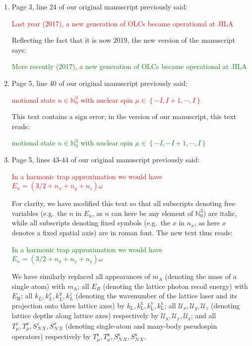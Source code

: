 \documentclass[preprint,showkeys,nofootinbib]{revtex4-1}
\renewcommand{\t}{\text} %
\newcommand{\p}[1]{\left(#1\right)} %
\renewcommand{\set}[1]{\left\{#1\right\}} %
\newcommand{\x}{\text{x}}
\newcommand{\y}{\text{y}}
\newcommand{\z}{\text{z}}
\newcommand{\N}{\mathcal{N}}
\newcommand{\U}{\mathcal{U}}
\newcommand{\1}{\mathds{1}}
\newcommand{\red}[1]{\textcolor{red}{#1}}
\newcommand{\green}[1]{\textcolor{green}{#1}}
\begin{document}
\begin{enumerate}[label=(R3.\arabic*)]
\item Page 3, line 24 of our original manuscript previously said:

  \red{Last year (2017), a new generation of OLCs became operational
    at JILA}

  Reflecting the fact that it is now 2019, the new version of the
  manuscript says:

  \green{More recently (2017), a new generation of OLCs became
    operational at JILA}


\item Page 5, line 40 of our original manuscript previously said:

  \red{motional state $n\in\mathbb{N}_0^3$ with nuclear spin
    $\mu\in\set{-I,I+1,\cdots,I}$}

  This text contains a sign error; in the version of our manuscript,
  this text reads:

  \green{motional state $n\in\mathbb{N}_0^3$ with nuclear spin
    $\mu\in\set{-I,-I+1,\cdots,I}$}


\item Page 5, lines 43-44 of our original manuscript previously said:

  \red{In a harmonic trap approximation we would have
    $E_n=\p{3/2+n_x+n_y+n_z}\omega$}

  For clarity, we have modified this text so that all subscripts
  denoting free variables (e.g.~the $n$ in $E_n$, as $n$ can here be
  any element of $\mathbb{N}_0^3$) are italic, while all subscripts
  denoting fixed symbols (e.g.~the $x$ in $n_x$, as here $x$ denotes a
  fixed spatial axis) are in roman font.  The new text thus reads:

  \green{In a harmonic trap approximation we would have
    $E_n=\p{3/2+n_\x+n_\y+n_\z}\omega$}

  We have similarly replaced all appearances of $m_A$ (denoting the
  mass of a single atom) with $m_{\text{A}}$; all $E_R$ (denoting the
  lattice photon recoil energy) with $E_{\t{R}}$; all
  $k_L,k_L^x,k_L^y,k_L^z$ (denoting the wavenumber of the lattice
  laser and its projection onto three lattice axes) by
  $k_{\text{L}}, k_{\text{L}}^\x, k_{\text{L}}^\y, k_{\text{L}}^\z$;
  all $\U_x,\U_y,\U_z$ (denoting lattice depths along lattice axes)
  respectively by $\U_\x,\U_\y,\U_\z$; and all
  $T_\mu^z,T_\mu^x,S_{\N X}^z,S_{\N X}^x$ (denoting single-atom and
  many-body pseudospin operators) respectively by
  $T_\mu^\z,T_\mu^\x,S_{\N X}^\z,S_{\N X}^\x$.


\end{enumerate}
\end{document}
